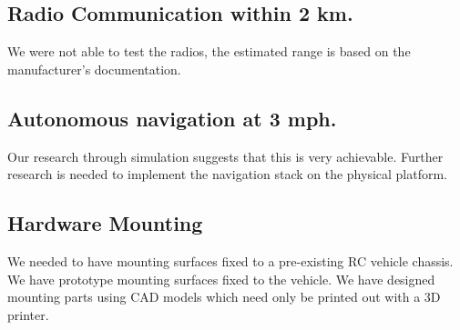 \documentclass[compsoc,draftclsnofoot,onecolumn,10pt]{IEEEtran}
\begin{document}
\subsection{Radio Communication within 2 km.}
We were not able to test the radios, the estimated range is based on the manufacturer's documentation.

\subsection{Autonomous navigation at 3 mph.}
Our research through simulation suggests that this is very achievable.  Further research is needed to implement the navigation stack on the physical platform.

\subsection{Hardware Mounting}
We needed to have mounting surfaces fixed to a pre-existing RC vehicle chassis. We have prototype mounting surfaces fixed to the vehicle. We have designed mounting parts using CAD models which need only be printed out with a 3D printer.
\end{document}
